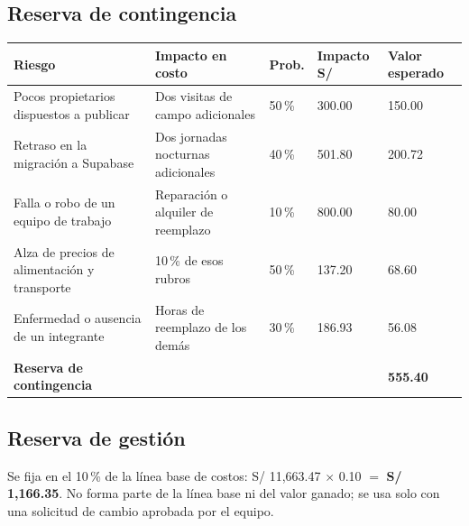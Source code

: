 \documentclass[11pt,a4paper]{article}
\begin{document}
\subsection{Reserva de contingencia}
{\small
{}
\noindent\begin{tabularx}{\textwidth}{@{}L P{3.9cm} C{1.4cm} Q{1.6cm} Q{1.7cm}@{}}
\toprule
{}
\textbf{Riesgo} & \textbf{Impacto en costo} & \textbf{Prob.} & \textbf{Impacto S/} & \textbf{Valor esperado} \\
\midrule
Pocos propietarios dispuestos a publicar & Dos visitas de campo adicionales & 50\,\% & 300.00 & 150.00 \\
Retraso en la migración a Supabase & Dos jornadas nocturnas adicionales & 40\,\% & 501.80 & 200.72 \\
Falla o robo de un equipo de trabajo & Reparación o alquiler de reemplazo & 10\,\% & 800.00 & 80.00 \\
Alza de precios de alimentación y transporte & 10\,\% de esos rubros & 50\,\% & 137.20 & 68.60 \\
Enfermedad o ausencia de un integrante & Horas de reemplazo de los demás & 30\,\% & 186.93 & 56.08 \\
\midrule
{}\textbf{Reserva de contingencia} & & & & \textbf{555.40} \\
\bottomrule
\end{tabularx}
}

\vspace{0.2cm}
\subsection{Reserva de gestión}
Se fija en el 10\,\% de la línea base de costos: S/ 11,663.47 $\times$ 0.10 $=$ \textbf{S/ 1,166.35}. No forma parte de la línea base ni del valor ganado; se usa solo con una solicitud de cambio aprobada por el equipo.

\end{document}
